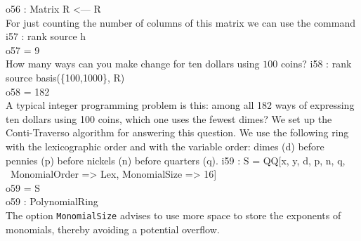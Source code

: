 o56 : Matrix R  <--- R\\
\endOutput
For just counting the number of columns of this matrix
we can use the command
\beginOutput
i57 : rank source h\\
\emptyLine
o57 = 9\\
\endOutput
How many ways can you make change for ten dollars using $100$ coins?
\beginOutput
i58 : rank source basis(\{100,1000\}, R)\\
\emptyLine
o58 = 182\\
\endOutput
A typical integer programming problem is this: among all 182 ways of
expressing ten dollars using 100 coins, which one uses the fewest dimes?
We set up the  Conti-Traverso algorithm \cite[\S 8.1]{CLO2} for 
answering this question. We use the following ring with the lexicographic
order and with the variable order:
dimes (d) before pennies (p) before nickels (n) before quarters (q).
\beginOutput
i59 : S = QQ[x, y, d, p, n, q, \\
\          MonomialOrder => Lex, MonomialSize => 16]\\
\emptyLine
o59 = S\\
\emptyLine
o59 : PolynomialRing\\
\endOutput
The option {\tt MonomialSize} advises \Mtwo to use more space to store the
exponents of monomials, thereby avoiding a potential overflow.


